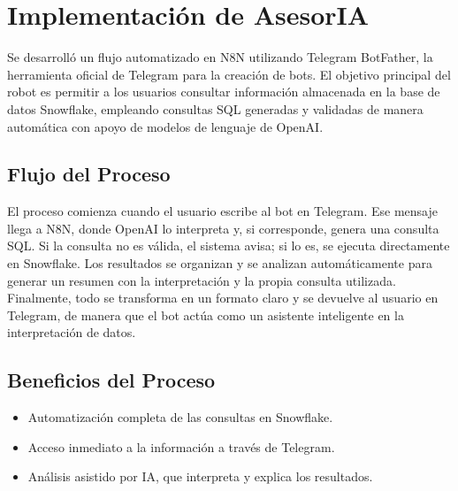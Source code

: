 \documentclass[letterpaper,10pt,spanish]{sphinxmanual}
\begin{document}
\sphinxstepscope


\chapter{Implementación de AsesorIA}
\label{\detokenize{ImplementacionAcesorIA:implementacion-de-asesoria}}\label{\detokenize{ImplementacionAcesorIA::doc}}
\sphinxAtStartPar
Se desarrolló un flujo automatizado en N8N utilizando Telegram BotFather, la herramienta oficial de Telegram para la creación de bots. El objetivo principal del robot es permitir a los usuarios consultar información almacenada en la base de datos Snowflake, empleando consultas SQL generadas y validadas de manera automática con apoyo de modelos de lenguaje de OpenAI.


\section{Flujo del Proceso}
\label{\detokenize{ImplementacionAcesorIA:flujo-del-proceso}}
\sphinxAtStartPar
El proceso comienza cuando el usuario escribe al bot en Telegram. Ese mensaje llega a N8N, donde OpenAI lo interpreta y, si corresponde, genera una consulta SQL. Si la consulta no es válida, el sistema avisa; si lo es, se ejecuta directamente en Snowflake. Los resultados se organizan y se analizan automáticamente para generar un resumen con la interpretación y la propia consulta utilizada. Finalmente, todo se transforma en un formato claro y se devuelve al usuario en Telegram, de manera que el bot actúa como un asistente inteligente en la interpretación de datos.

\sphinxAtStartPar
{}

\sphinxAtStartPar
{}


\section{Beneficios del Proceso}
\label{\detokenize{ImplementacionAcesorIA:beneficios-del-proceso}}\begin{itemize}
\item {} 
\sphinxAtStartPar
Automatización completa de las consultas en Snowflake.

\item {} 
\sphinxAtStartPar
Acceso inmediato a la información a través de Telegram.

\item {} 
\sphinxAtStartPar
Análisis asistido por IA, que interpreta y explica los resultados.

\end{itemize}
\end{document}
